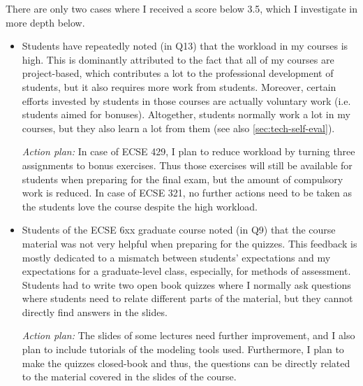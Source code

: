 There are only two cases where I received a score below 3.5, which I investigate in more depth below. 
\begin{itemize}
\item Students have repeatedly noted (in Q13) that the workload in my courses is high. 
This is dominantly attributed to the fact that all of my courses are project-based, which contributes a lot to the professional development of students, but it  also requires more work from students.  Moreover, certain efforts invested by students in those courses are actually voluntary work (i.e. students aimed for bonuses). Altogether, students normally work a lot in my courses, but they also learn a lot from them (see also \autoref{sec:tech-self-eval}). 

\emph{Action plan:} In case of ECSE 429, I plan to reduce workload by turning three assignments to bonus exercises. Thus those exercises will still be available for students when preparing for the final exam, but the amount of compulsory work is reduced. In case of ECSE 321, no further actions need to be taken as the students love the course despite the high workload.

\item Students of the ECSE 6xx graduate course noted (in Q9) that the course material was not very helpful when preparing for the quizzes. This feedback is mostly dedicated to a mismatch between students' expectations and my expectations for a graduate-level class, especially, for methods of assessment. Students had to write two open book quizzes where I normally ask questions where students need to relate different parts of the material, but they cannot directly find answers in the slides. 

\emph{Action plan:} The slides of some lectures need further improvement, and I also plan to include tutorials of the modeling tools used. Furthermore, I plan to make the quizzes closed-book and thus, the questions can be directly related to the material covered in the slides of the course.  

\end{itemize}

